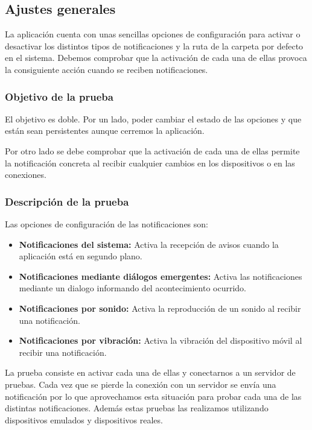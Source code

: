 \subsection{Ajustes generales}

La aplicación cuenta con unas sencillas opciones de configuración para activar o desactivar los distintos tipos de notificaciones y la ruta de la carpeta por defecto en el sistema. Debemos comprobar que la activación de cada una de ellas provoca la consiguiente acción cuando se reciben notificaciones.


\subsubsection{Objetivo de la prueba}

El objetivo es doble. Por un lado, poder cambiar el estado de las opciones y que están sean persistentes aunque cerremos la aplicación.

\bigskip
Por otro lado se debe comprobar que la activación de cada una de ellas permite la notificación concreta al recibir cualquier cambios en los dispositivos o en las conexiones.


\subsubsection{Descripción de la prueba}

Las opciones de configuración de las notificaciones son:

\begin{itemize}
  \item \textbf{Notificaciones del sistema:} Activa la recepción de avisos cuando la aplicación está en segundo plano.
  \item \textbf{Notificaciones mediante diálogos emergentes:} Activa las notificaciones mediante un dialogo informando del acontecimiento ocurrido.
  \item \textbf{Notificaciones por sonido:} Activa la reproducción de un sonido al recibir una notificación.
  \item \textbf{Notificaciones por vibración:} Activa la vibración del dispositivo móvil al recibir una notificación.
\end{itemize}

\bigskip
La prueba consiste en activar cada una de ellas y conectarnos a un servidor de pruebas. Cada vez que se pierde la conexión con un servidor se envía una notificación por lo que aprovechamos esta situación para probar cada una de las distintas notificaciones. Además estas pruebas las realizamos utilizando dispositivos emulados y dispositivos reales.

